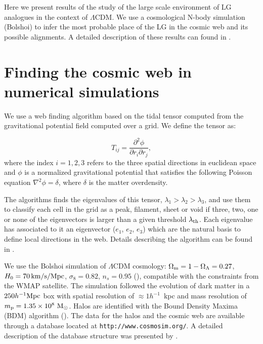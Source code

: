 \documentclass{iau}
\newcommand{\hmpc}{{\ifmmode{h^{-1}{\rm Mpc}}\else{$h^{-1}$Mpc }\fi}}
\begin{document}
Here we present results of the study of the large scale environment of
LG analogues in the context of $\Lambda$CDM. We use a cosmological
N-body simulation (Bolshoi) to infer the most probable place of the LG
in the cosmic web and its possible alignments. A detailed description
of these results can found in \cite{lgweb}.



\section{Finding the cosmic web in numerical simulations}

We use a web finding algorithm based on the tidal tensor computed from
the gravitational potential field computed over a grid. We define the
tensor as:

\begin{equation}
T_{ij} = \frac{\partial^2\phi}{\partial r_{i}\partial r_{j}}, 
\end{equation}
%
where the index $i=1,2,3$ refers to the three spatial directions in
euclidean space and $\phi$ is a normalized gravitational potential
that satisfies the following Poisson equation $\nabla^2 \phi=\delta$,
where $\delta$ is the matter overdensity.

The algorithms finds the eigenvalues of this tensor, 
$\lambda_1>\lambda_2>\lambda_3$, and use them to classify each cell in
the grid as a peak, filament, sheet or void if three, two, one or none
of the eigenvectors is larger than a given threshold $\lambda_{\rm
  th}$. Each eigenvalue has associated to it an eigenvector ($e_{1}$,
$e_{2}$, $e_{3}$) which are the natural basis to define local
directions in the web. Details describing the algorithm can be found
in \cite[Forero-Romero et al. (2009)]{Tweb}.


We use the Bolshoi simulation of $\Lambda$CDM cosmology: $\Omega_{\rm
  m}=1-\Omega_{\Lambda}=0.27$, $H_0=70\,\rm km/s/Mpc$,
$\sigma_8=0.82$, $n_s=0.95$ (\cite{2011ApJ...740..102K}), compatible
with the constraints from the WMAP satellite. The simulation followed the evolution of dark
matter in a $250 \hmpc$ box with spatial resolution of $\approx
1h^{-1}$~kpc and mass resolution of $m_{\rm p}=1.35\times 10^8\ \rm
M_{\odot}$. Halos are identified with the Bound Density Maxima (BDM) algorithm
(\cite{1997astro.ph.12217K}). The data for the halos and the cosmic
web are available through a database located at
{\tt http://www.cosmosim.org/}. A detailed description of the database
structure was presented by \cite{Riebe2013}. 
\end{document}
